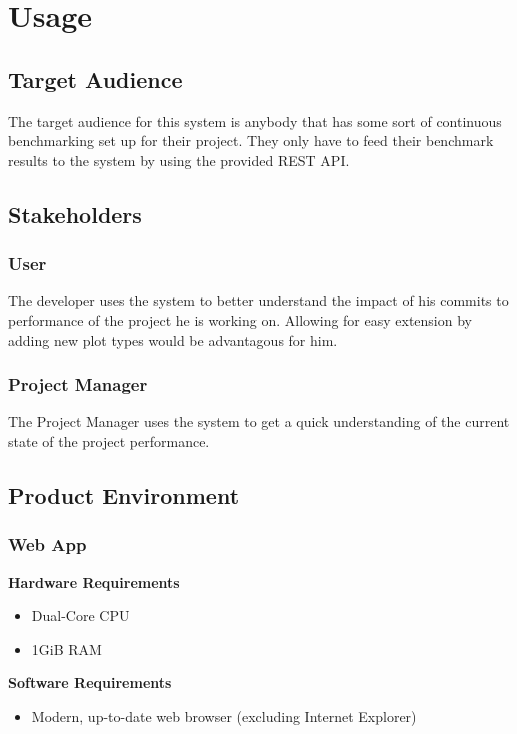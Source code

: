 \section{Usage}

\subsection{Target Audience}

The target audience for this system is anybody that has some sort of continuous benchmarking set up for their project. They only have to feed their benchmark results to the system by using the provided \gls{REST API}.

\subsection{Stakeholders}

\subsubsection*{User}

The developer uses the system to better understand the impact of his commits to performance of the project he is working on. Allowing for easy extension by adding new \gls{plot} types would be advantagous for him.

\subsubsection*{Project Manager}

The Project Manager uses the system to get a quick understanding of the current state of the project performance.

\subsection{Product Environment}

\subsubsection*{Web App}

\textbf{Hardware Requirements}
\begin{itemize}
    \item Dual-Core CPU
    \item 1GiB RAM
\end{itemize}

\textbf{Software Requirements}
\begin{itemize}
    \item Modern, up-to-date web browser (excluding Internet Explorer)
\end{itemize}

